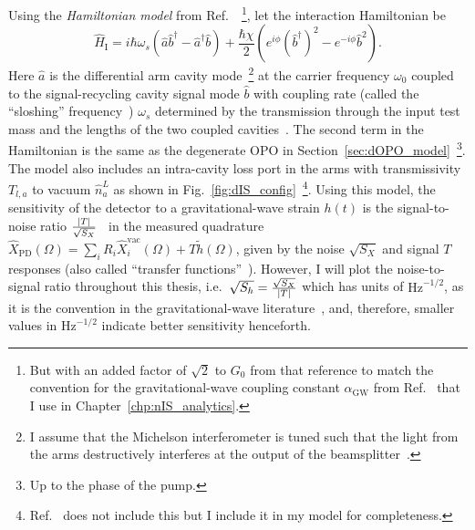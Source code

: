 Using the \emph{Hamiltonian model} from Ref.~\cite{korobkoQuantumExpanderGravitationalwave2019}~\footnote{But with an added factor of $\sqrt{2}$ to $G_0$ from that reference to match the convention for the gravitational-wave coupling constant $\alpha_\text{GW}$ from Ref.~\cite{liBroadbandSensitivityImprovement2020} that I use in Chapter~\ref{chp:nIS_analytics}.}, let the interaction Hamiltonian be
\begin{equation}
\hat{H}_\text{I}=i\hbar\omega_s(\hat{a}\hat{b}^\dag-\hat{a}^\dag\hat{b})+\frac{\hbar\chi}{2}(e^{i\phi} (\hat b^\dag)^2 - e^{-i\phi} \hat b^2).
\end{equation}
Here $\hat a$ is the differential arm cavity mode~\footnote{I assume that the Michelson interferometer is tuned such that the light from the arms destructively interferes at the output of the beamsplitter~\cite{}.} at the carrier frequency $\omega_0$ coupled to the signal-recycling cavity signal mode $\hat b$ with coupling rate (called the ``sloshing'' frequency~\cite{}) $\omega_s$ determined by the transmission through the input test mass and the lengths of the two coupled cavities~\cite{}. %
The second term in the Hamiltonian is the same as the degenerate OPO in Section~\ref{sec:dOPO_model}~\footnote{Up to the phase of the pump.}.
The model also includes an intra-cavity loss port in the arms with transmissivity $T_{l,a}$ to vacuum $\hat n^L_a$ as shown in Fig.~\ref{fig:dIS_config}~\footnote{Ref.~\cite{korobkoQuantumExpanderGravitationalwave2019} does not include this but I include it in my model for completeness.}. 
Using this model, the sensitivity of the detector to a gravitational-wave strain $h(t)$ is the signal-to-noise ratio $\frac{\abs{T}}{\sqrt{S_X}}$~\cite{} in the measured quadrature $\hat X_\text{PD}(\Omega)=\sum_i R_i \hat X_i^\text{vac}(\Omega) + T \tilde h(\Omega)$, given by the noise $\sqrt{S_X}$ and signal $T$ responses (also called ``transfer functions''~\cite{}). However, I will plot the noise-to-signal ratio throughout this thesis, i.e.\ $\sqrt{S_h}=\frac{\sqrt{S_X}}{\abs{T}}$ which has units of $\text{Hz}^{-1/2}$, as it is the convention in the gravitational-wave literature~\cite{}, and, therefore, smaller values in $\text{Hz}^{-1/2}$ indicate better sensitivity henceforth. 

